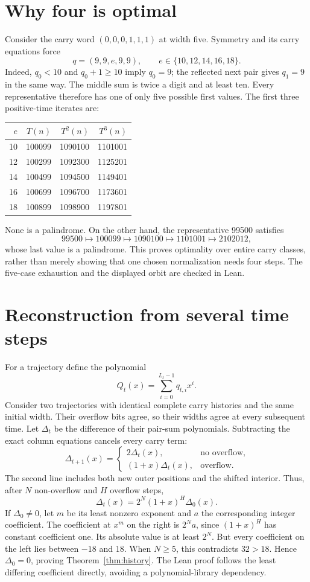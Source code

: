 \documentclass[11pt]{article}
\begin{document}
\section{Why four is optimal}
Consider the carry word $(0,0,0,1,1,1)$ at width five. Symmetry and its carry
equations force
\[
q=(9,9,e,9,9),\qquad e\in\{10,12,14,16,18\}.
\]
Indeed, $q_0<10$ and $q_0+1\geq10$ imply $q_0=9$; the reflected next pair
gives $q_1=9$ in the same way. The middle sum is twice a digit and at least
ten. Every representative therefore has one of only five possible first
values. The first three positive-time iterates are:
\begin{center}
\begin{tabular}{rrrr}
\toprule
$e$&$T(n)$&$T^2(n)$&$T^3(n)$\\
\midrule
10&100099&1090100&1101001\\
12&100299&1092300&1125201\\
14&100499&1094500&1149401\\
16&100699&1096700&1173601\\
18&100899&1098900&1197801\\
\bottomrule
\end{tabular}
\end{center}
None is a palindrome. On the other hand, the representative 99500 satisfies
\[
99500\longmapsto100099\longmapsto1090100\longmapsto1101001
\longmapsto2102012,
\]
whose last value is a palindrome. This proves optimality over entire carry
classes, rather than merely showing that one chosen normalization needs four
steps. The five-case exhaustion and the displayed orbit are checked in Lean.

\section{Reconstruction from several time steps}
For a trajectory define the polynomial
\[
 Q_t(x)=\sum_{i=0}^{L_t-1}q_{t,i}x^i.
\]
Consider two trajectories with identical complete carry histories and the
same initial width. Their overflow bits agree, so their widths agree at every
subsequent time. Let $\Delta_t$ be the difference of their pair-sum
polynomials. Subtracting the exact column equations cancels every carry term:
\begin{equation}\label{eq:diff}
 \Delta_{t+1}(x)=
 \begin{cases}
 2\Delta_t(x),&\text{no overflow},\\
 (1+x)\Delta_t(x),&\text{overflow}.
 \end{cases}
\end{equation}
The second line includes both new outer positions and the shifted interior.
Thus, after $N$ non-overflow and $H$ overflow steps,
\[
 \Delta_t(x)=2^N(1+x)^H\Delta_0(x).
\]
If $\Delta_0\ne0$, let $m$ be its least nonzero exponent and $a$ the
corresponding integer coefficient. The coefficient at $x^m$ on the right
is $2^Na$, since $(1+x)^H$ has constant coefficient one. Its absolute value
is at least $2^N$. But every coefficient on the left lies between $-18$ and
$18$. When $N\geq5$, this contradicts $32>18$. Hence $\Delta_0=0$, proving
Theorem~\ref{thm:history}. The Lean proof follows the least differing
coefficient directly, avoiding a polynomial-library dependency.
\end{document}
